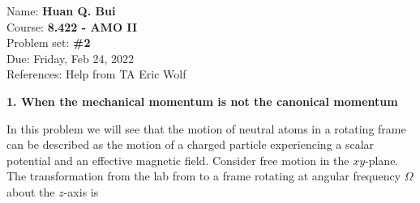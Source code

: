 \documentclass{article}
\theoremstyle{definition}
\begin{document}
\begin{framed}
\noindent Name: \textbf{Huan Q. Bui}\\
Course: \textbf{8.422 - AMO II}\\
Problem set: \textbf{\#2}\\
Due: Friday, Feb 24, 2022\\
References: Help from TA Eric Wolf
\end{framed}
	
	




\noindent \textbf{1. When the mechanical momentum is not the canonical momentum}

\noindent In this problem we will see that the motion of neutral atoms in a rotating frame can be described as the motion of a charged particle experiencing a scalar potential and an effective magnetic field. Consider free motion in the $xy$-plane. The transformation from the lab from to a frame rotating at angular frequency $\Omega$ about the $z$-axis is 
\end{document}
